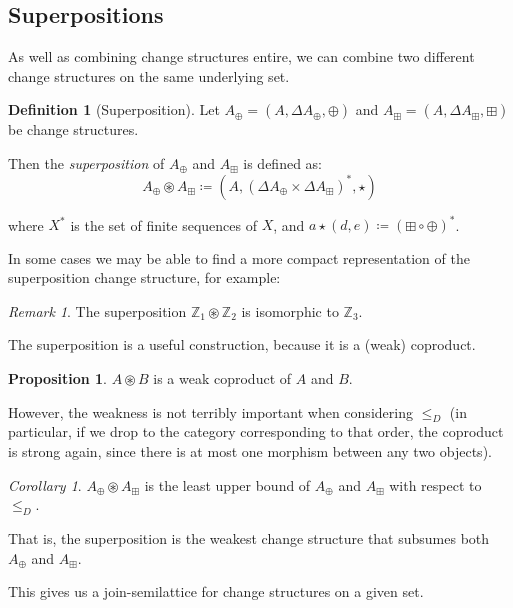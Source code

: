 \documentclass[english]{article}
\theoremstyle{plain}
\theoremstyle{definition}
\newtheorem{prop}[thm]{Proposition}
\theoremstyle{remark}
\theoremstyle{remark}
\newtheorem{corollary}[thm]{Corollary}
\theoremstyle{remark}
\newtheorem{rem}[thm]{Remark}
\theoremstyle{definition}
\newtheorem{defn}{Definition}
\newcommand{\defeq}{\coloneqq}
\newcommand{\cplus}{\oplus}
\newcommand{\cpluss}{\boxplus}
\newcommand{\cstruct}[3]{(#1,#2,#3)}
\newcommand{\changes}[1]{\Delta #1}
\newcommand{\superpose}{\circledast}
\newcommand{\fineOrder}{\leq_D}
\begin{document}
\subsection{Superpositions}

As well as combining change structures entire, we can combine two different
change structures on the same underlying set.

\begin{defn}[Superposition]
  Let $A_\cplus = \cstruct{A}{\changes{A}_\cplus}{\cplus}$ and $A_\cpluss =
  \cstruct{A}{\changes{A}_\cpluss}{\cpluss}$ be change structures.

  Then the \textit{superposition} of $A_\cplus$ and $A_\cpluss$ is defined as:
  $$A_\cplus \superpose A_\cpluss \defeq \cstruct{A}{
    (\changes{A}_\cplus \times \changes{A}_\cpluss)^\ast}{\star}$$

  where $X^\ast$ is the set of finite sequences of $X$, and $a \star (d, e)
  \defeq (\cpluss \circ \cplus)^\ast$.
\end{defn}

In some cases we may be able to find a more compact representation of the
superposition change structure, for example:

\begin{rem}
  The superposition $\mathbb{Z}_1 \superpose \mathbb{Z}_2$ is isomorphic to $\mathbb{Z}_3$.
\end{rem}

The superposition is a useful construction, because it is a (weak) coproduct.

\begin{prop}
  $A \superpose B$ is a weak coproduct of $A$ and $B$.
\end{prop}

However, the weakness is not terribly important when considering $\fineOrder$
(in particular, if we drop to the category corresponding to that order, the
coproduct is strong again, since there is at most one morphism between any two
objects). 

\begin{corollary}
  $A_\cplus \superpose A_\cpluss$ is the least upper bound of $A_\cplus$ and $A_\cpluss$ with respect to $\fineOrder$.
\end{corollary}

That is, the superposition is the weakest change structure that subsumes both
$A_\cplus$ and $A_\cpluss$.

This gives us a join-semilattice for change structures on a given set.
\end{document}

